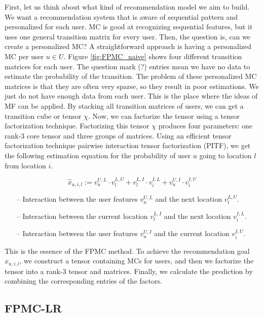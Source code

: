 \documentclass{sig-alternate}
\begin{document}
First, let us think about what kind of recommendation model we aim to build. 
We want a recommendation system that is aware of sequential pattern and personalized for each user.
MC is good at recognizing sequential features, but it uses one general transition matrix for every user. 
Then, the question is, can we create a personalized MC?
A straightforward approach is having a personalized MC per user $u \in U$. 
Figure \ref{fig:FPMC_naive} shows four different transition matrices for each user. 
The question mark (?) entries mean we have no data to estimate the probability of the transition. The problem of these personalized 
MC matrices is that they are often very sparse, so they result in poor estimations. We just do not have enough data from
each user. This is the place where the ideas of MF can be applied. By stacking all transition matrices of users, 
we can get a transition cube or tensor $\chi$. Now, we can factorize the tensor using a tensor factorization technique. 
Factorizing this tensor $\chi$ produces four parameters: one rank-3 core tensor and three groups of matrices. Using an efficient tensor 
factorization technique pairwise interaction tensor factorization (PITF), we get the following 
estimation equation for the probability of user $u$ going to location $l$ from location $i$. \cite{Rendle:2010:PIT}

\begin{equation}
	\hat{x}_{u,i,l} := v_u^{U,L} \cdot v_l^{L,U} + v_l^{L,I} \cdot v_i^{I,L} + v_u^{U,I} \cdot v_i^{I,U}
\label{eq:MF}
\end{equation}

\begin{itemize}
\item[--] Interaction between the user features $v_u^{U,L}$ and the next location $v_l^{L,U}$.
\item[--] Interaction between the current location $v_l^{L,I}$ and the next location $v_i^{I,L}$.
\item[--] Interaction between the user features $v_u^{U,I}$ and the current location $v_i^{I,U}$.
\end{itemize}

This is the essence of the FPMC method. To achieve the recommendation goal $\hat{x}_{u,i,l}$, we 
construct a tensor containing MCs for users, and then we factorize the tensor into a rank-3 tensor 
and matrices. Finally, we calculate the prediction by combining the corresponding entries of the
factors. 

\subsection{FPMC-LR}
\label{sec:typeChangesSpecialChars}
\end{document}
